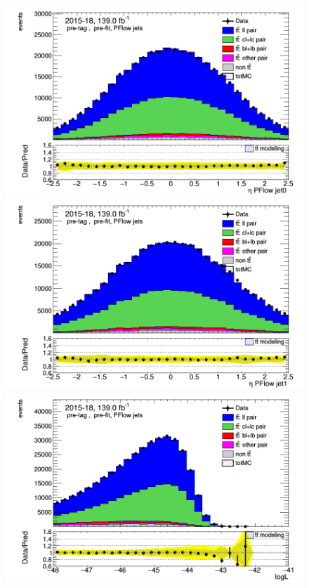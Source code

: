 \documentclass[letterpaper,12pt]{article}
\begin{document}
	
	\begin{figure}
	\begin{minipage}[b]{.45\textwidth}
	\centering
	\includegraphics[width=1\textwidth]{Oct_distributions/pretagNoRwDL1rwithhighpTPFlow_scaledall/DataMC_J0_eta.png}
	\end{minipage}\hfill
	\begin{minipage}[b]{.45\textwidth}
	\centering
	\includegraphics[width=1\textwidth]{Oct_distributions/pretagNoRwDL1rwithhighpTPFlow_scaledall/DataMC_J1_eta.png}
	\end{minipage}\hfill
	\begin{minipage}[b]{.45\textwidth}
	\centering
	\includegraphics[width=1\textwidth]{Oct_distributions/pretagNoRwDL1rwithhighpTPFlow_scaledall/DataMC_LLR.png}

\end{minipage}
\end{figure}
\end{document}
